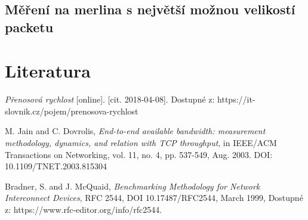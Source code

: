\documentclass[11pt] {article}
\begin{document}
\subsection{Měření na merlina s největší možnou velikostí packetu }
\newline
\newpage
\section{Literatura}
\begin{thebibliography}{9}

  \emph{Přenosová rychlost} [online]. 
  [cit. 2018-04-08]. 
  Dostupné z: https://it-slovnik.cz/pojem/prenosova-rychlost

	M. Jain and C. Dovrolis, \emph{End-to-end available bandwidth: measurement methodology, dynamics, and relation with TCP throughput}, in IEEE/ACM Transactions on Networking, vol. 11, no. 4, pp. 537-549, Aug. 2003.
DOI: 10.1109/TNET.2003.815304

	Bradner, S. and J. McQuaid, \emph{Benchmarking Methodology for Network Interconnect Devices}, RFC 2544, DOI 10.17487/RFC2544, March 1999, Dostupné z: https://www.rfc-editor.org/info/rfc2544.
\end{thebibliography}
\end{document}
